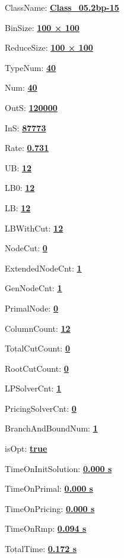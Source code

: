 \documentclass[11pt]{article}
\begin{document}
\pagestyle{empty}


ClassName: \underline{\textbf{Class_05.2bp-15}}
\par
BinSize: \underline{\textbf{100 × 100}}
\par
ReduceSize: \underline{\textbf{100 × 100}}
\par
TypeNum: \underline{\textbf{40}}
\par
Num: \underline{\textbf{40}}
\par
OutS: \underline{\textbf{120000}}
\par
InS: \underline{\textbf{87773}}
\par
Rate: \underline{\textbf{0.731}}
\par
UB: \underline{\textbf{12}}
\par
LB0: \underline{\textbf{12}}
\par
LB: \underline{\textbf{12}}
\par
LBWithCut: \underline{\textbf{12}}
\par
NodeCut: \underline{\textbf{0}}
\par
ExtendedNodeCnt: \underline{\textbf{1}}
\par
GenNodeCnt: \underline{\textbf{1}}
\par
PrimalNode: \underline{\textbf{0}}
\par
ColumnCount: \underline{\textbf{12}}
\par
TotalCutCount: \underline{\textbf{0}}
\par
RootCutCount: \underline{\textbf{0}}
\par
LPSolverCnt: \underline{\textbf{1}}
\par
PricingSolverCnt: \underline{\textbf{0}}
\par
BranchAndBoundNum: \underline{\textbf{1}}
\par
isOpt: \underline{\textbf{true}}
\par
TimeOnInitSolution: \underline{\textbf{0.000 s}}
\par
TimeOnPrimal: \underline{\textbf{0.000 s}}
\par
TimeOnPricing: \underline{\textbf{0.000 s}}
\par
TimeOnRmp: \underline{\textbf{0.094 s}}
\par
TotalTime: \underline{\textbf{0.172 s}}
\par
\newpage


\end{document}
